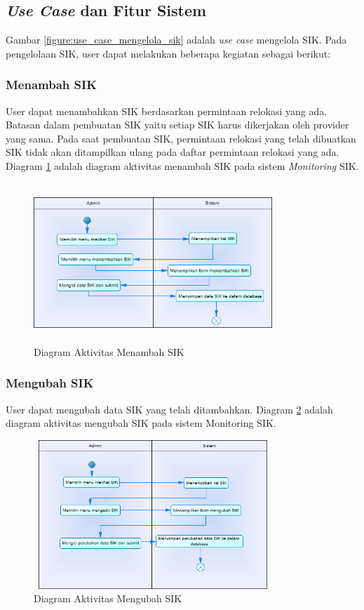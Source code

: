\subsection{\textit{Use Case} dan Fitur Sistem}
Gambar \ref{figure:use_case_mengelola_sik} adalah \textit{use case} mengelola SIK. Pada pengelolaan SIK, user dapat melakukan beberapa kegiatan sebagai berikut:
	\subsubsection{Menambah SIK}
	User dapat menambahkan SIK berdasarkan permintaan relokasi yang ada. Batasan dalam pembuatan SIK yaitu setiap SIK harus dikerjakan oleh provider yang sama. Pada saat pembuatan SIK, permintaan relokasi yang telah dibuatkan SIK tidak akan ditampilkan ulang pada daftar permintaan relokasi yang ada. Diagram \ref{figure:activity_menambah_sik} adalah diagram aktivitas menambah SIK pada sistem \textit{Monitoring} SIK.
	\begin{figure}[h]
	\centerline {\includegraphics[width=9cm,height=6cm]{bab4/ActivityDiagram_MenambahkanSIK.png}}
	\caption{Diagram Aktivitas Menambah SIK}
	\label{figure:activity_menambah_sik}
	\end{figure}
		
	\subsubsection{Mengubah SIK}
	User dapat mengubah data SIK yang telah ditambahkan. Diagram \ref{figure:activity_mengubah_sik} adalah diagram aktivitas mengubah SIK pada sistem Monitoring SIK.
	\begin{figure}[h]
	\centerline {\includegraphics[width=9cm,height=5.6cm]{bab4/ActivityDiagram_MengubahSIK.png}}
	\caption{Diagram Aktivitas Mengubah SIK}
	\label{figure:activity_mengubah_sik}
	\end{figure}

